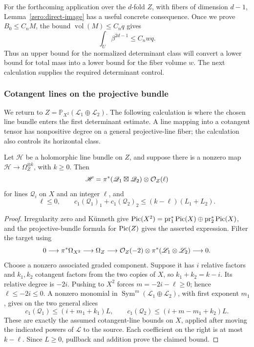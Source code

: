 For the forthcoming application over the \(d\)-fold \(Z\), with fibers
of dimension \(d-1\), Lemma~\ref{zero:direct-image} has a useful concrete
consequence.  Once we prove \(B_0\le C_nM\), the bound
\(\operatorname{vol}(M)\le C_nq\) gives
\[
 \int_U\beta^{2d-1}\le C_nwq.
\]
Thus an upper bound for the normalized determinant class will convert
a lower bound for total mass into a lower bound for the fiber volume
\(w\).  The next calculation supplies the required determinant control.

\subsubsection{Cotangent lines on the projective bundle}

We return to \(Z=\mathbb P_{X^2}(\mathscr L_1\oplus\mathscr L_2)\).
The following calculation is where the chosen line bundle enters the
first determinant estimate.  A line mapping into a cotangent tensor
has nonpositive degree on a general projective-line fiber; the
calculation also controls its horizontal class.

\begin{lemma}\label{zero:cotangent-Z}
Let \(\mathscr H\) be a holomorphic line bundle on \(Z\), and suppose
there is a nonzero map \(\mathscr H\to\Omega_Z^{\otimes k}\), with
\(k\ge0\).  Then
\[
 \mathscr H=\pi^*(\mathscr Q_1\boxtimes\mathscr Q_2)
                   \otimes\mathcal O_Z(\ell)
\]
for lines \(\mathscr Q_i\) on \(X\) and an integer \(\ell\), and
\[
 \ell\le0,\qquad
 c_1(\mathscr Q_1)_1+c_1(\mathscr Q_2)_2
        \le(k-\ell)(L_1+L_2).
\]
\end{lemma}

\begin{proof}
Irregularity zero and Künneth give
\(\operatorname{Pic}(X^2)=\operatorname{pr}_1^*\operatorname{Pic}(X)\oplus
\operatorname{pr}_2^*\operatorname{Pic}(X)\), and the projective-bundle formula for
\(\operatorname{Pic}(Z)\) gives the asserted expression.  Filter the target using
\[
 0\longrightarrow\pi^*\Omega_{X^2}\longrightarrow\Omega_Z
 \longrightarrow\mathcal O_Z(-2)\otimes
        \pi^*(\mathscr L_1\otimes\mathscr L_2)\longrightarrow0.
\]
Choose a nonzero associated graded component.  Suppose it has \(i\)
relative factors and \(k_1,k_2\) cotangent factors from the two copies
of \(X\), so \(k_1+k_2=k-i\).  Its relative degree is \(-2i\).
Pushing to \(X^2\) forces \(m=-2i-\ell\ge0\); hence
\(\ell\le-2i\le0\).  A nonzero monomial in
\(\operatorname{Sym}^m(\mathscr L_1\oplus\mathscr L_2)\), with first
exponent \(m_1\), gives on the two general slices
\[
 c_1(\mathscr Q_1)\le(i+m_1+k_1)L,\qquad
 c_1(\mathscr Q_2)\le(i+m-m_1+k_2)L.
\]
These are exactly the assumed cotangent-line bounds on \(X\), applied
after moving the indicated powers of \(\mathscr L\) to the source.
Each coefficient on the right is at most \(k-\ell\).  Since \(L\ge0\),
pullback and addition prove the claimed bound.
\end{proof}

